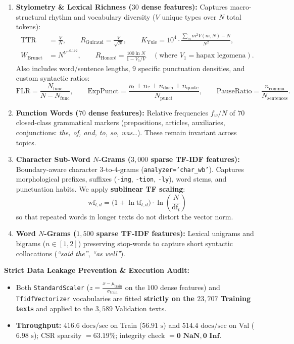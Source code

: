\documentclass[11pt, a4paper]{article}
\begin{document}
\begin{enumerate}[itemsep=3pt]
    \item \textbf{Stylometry \& Lexical Richness ($30$ dense features):} Captures macro-structural rhythm and vocabulary diversity ($V$ unique types over $N$ total tokens):
    \begin{align*}
        \text{TTR} &= \frac{V}{N}, \qquad
        R_{\text{Guiraud}} = \frac{V}{\sqrt{N}}, \qquad
        K_{\text{Yule}} = 10^4 \cdot \frac{\sum_{m} m^2 V(m, N) - N}{N^2}, \\[4pt]
        W_{\text{Brunet}} &= N^{V^{-0.172}}, \qquad
        R_{\text{Honor\'e}} = \frac{100 \ln N}{1 - V_1 / V} \quad (\text{where } V_1 = \text{hapax legomena}).
    \end{align*}
    Also includes word/sentence lengths, $9$ specific punctuation densities, and custom syntactic ratios:
    \[
        \text{FLR} = \frac{N_{\text{func}}}{N - N_{\text{func}}}, \qquad
        \text{ExpPunct} = \frac{n_{!} + n_{?} + n_{\text{dash}} + n_{\text{quote}}}{N_{\text{punct}}}, \qquad
        \text{PauseRatio} = \frac{n_{\text{comma}}}{N_{\text{sentences}}}.
    \]
    \item \textbf{Function Words ($70$ dense features):} Relative frequencies $f_w / N$ of $70$ closed-class grammatical markers (prepositions, articles, auxiliaries, conjunctions: \textit{the, of, and, to, so, was\dots}). These remain invariant across topics.
    \item \textbf{Character Sub-Word $N$-Grams ($3,000$ sparse TF-IDF features):} Boundary-aware character $3$-to-$4$-grams (\texttt{analyzer='char\_wb'}). Captures morphological prefixes, suffixes (\texttt{-ing}, \texttt{-tion}, \texttt{-ly}), word stems, and punctuation habits. We apply \textbf{sublinear TF scaling}:
    \[
        \text{wf}_{t,d} = \big(1 + \ln \text{tf}_{t,d}\big) \cdot \ln\!\left(\frac{N}{\text{df}_t}\right)
    \]
    so that repeated words in longer texts do not distort the vector norm.
    \item \textbf{Word $N$-Grams ($1,500$ sparse TF-IDF features):} Lexical unigrams and bigrams ($n \in [1, 2]$) preserving stop-words to capture short syntactic collocations (\textit{``said the''}, \textit{``as well''}).
\end{enumerate}

\noindent\textbf{Strict Data Leakage Prevention \& Execution Audit:}
\begin{itemize}[noitemsep]
    \item Both \texttt{StandardScaler} ($z = \frac{x - \mu_{\text{train}}}{\sigma_{\text{train}}}$ on the $100$ dense features) and \texttt{TfidfVectorizer} vocabularies are fitted \textbf{strictly on the $23,707$ Training texts} and applied to the $3,589$ Validation texts.
    \item \textbf{Throughput:} $416.6\text{ docs/sec}$ on Train ($56.91\text{ s}$) and $514.4\text{ docs/sec}$ on Val ($6.98\text{ s}$); CSR sparsity $= 63.19\%$; integrity check $= \mathbf{0\text{ NaN}, 0\text{ Inf}}$.
\end{itemize}
\end{document}
